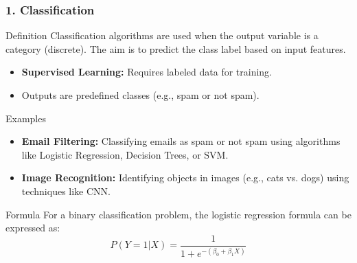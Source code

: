 \documentclass[aspectratio=169]{beamer}
\begin{document}
\begin{frame}[fragile]
    \frametitle{1. Classification}
    \begin{block}{Definition}
        Classification algorithms are used when the output variable is a category (discrete). The aim is to predict the class label based on input features.
    \end{block}
    
    \begin{itemize}
        \item \textbf{Supervised Learning:} Requires labeled data for training.
        \item Outputs are predefined classes (e.g., spam or not spam).
    \end{itemize}

    \begin{block}{Examples}
        \begin{itemize}
            \item \textbf{Email Filtering:} Classifying emails as spam or not spam using algorithms like Logistic Regression, Decision Trees, or SVM.
            \item \textbf{Image Recognition:} Identifying objects in images (e.g., cats vs. dogs) using techniques like CNN.
        \end{itemize}
    \end{block}
    
    \begin{block}{Formula}
        For a binary classification problem, the logistic regression formula can be expressed as:
        \begin{equation}
            P(Y=1|X) = \frac{1}{1 + e^{-(\beta_0 + \beta_1X)}}
        \end{equation}
    \end{block}
\end{frame}
\end{document}
